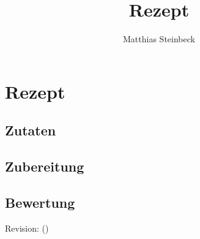 \documentclass[10pt,a4paper]{article}
\author{Matthias Steinbeck}
\title{Rezept}
\begin{document}
\section*{Rezept}
\subsection*{Zutaten}
\subsection*{Zubereitung}
\subsection*{Bewertung}
Revision\gitVtags: \gitAbbrevHash{} (\gitAuthorDate)
\end{document}
